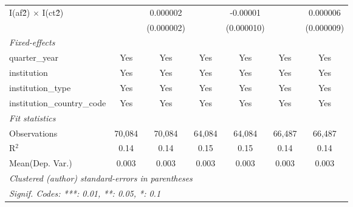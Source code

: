 \begin{tabular}{lcccccc}
   I(af\^2) $\times$ I(ct\^2)         &                & 0.000002       &                 & -0.00001       &                & 0.000006\\   
                                      &                & (0.000002)     &                 & (0.000010)     &                & (0.000009)\\   
   \midrule
   \emph{Fixed-effects}\\
   quarter\_year                      & Yes            & Yes            & Yes             & Yes            & Yes            & Yes\\  
   institution                        & Yes            & Yes            & Yes             & Yes            & Yes            & Yes\\  
   institution\_type                  & Yes            & Yes            & Yes             & Yes            & Yes            & Yes\\  
   institution\_country\_code         & Yes            & Yes            & Yes             & Yes            & Yes            & Yes\\  
   \midrule
   \emph{Fit statistics}\\
   Observations                       & 70,084         & 70,084         & 64,084          & 64,084         & 66,487         & 66,487\\  
   R$^2$                              & 0.14           & 0.14           & 0.15            & 0.15           & 0.14           & 0.14\\  
Mean(Dep. Var.) & 0.003 & 0.003 & 0.003 & 0.003 & 0.003 & 0.003 \\
   \midrule \midrule
   \multicolumn{7}{l}{\emph{Clustered (author) standard-errors in parentheses}}\\
   \multicolumn{7}{l}{\emph{Signif. Codes: ***: 0.01, **: 0.05, *: 0.1}}\\
\end{tabular}
\par\endgroup
